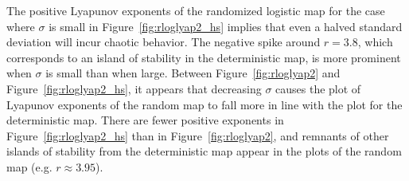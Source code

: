 The positive Lyapunov exponents of the randomized logistic
map for the case where $\sigma$ is small in
Figure~\ref{fig:rloglyap2_hs} implies that even a halved standard
deviation will incur chaotic behavior. The negative spike around
$r=3.8$, which corresponds to an island of stability in the
deterministic map, is more prominent when $\sigma$ is small than when large. Between
Figure~\ref{fig:rloglyap2} and Figure~\ref{fig:rloglyap2_hs}, it
appears that decreasing $\sigma$ causes the plot of Lyapunov exponents
of the random map to fall more in line with the plot for the
deterministic map. There are fewer positive exponents in
Figure~\ref{fig:rloglyap2_hs} than in Figure~\ref{fig:rloglyap2}, and
remnants of other islands of stability from the deterministic map
appear in the plots of the random map (e.g. $r \approx 3.95$).

